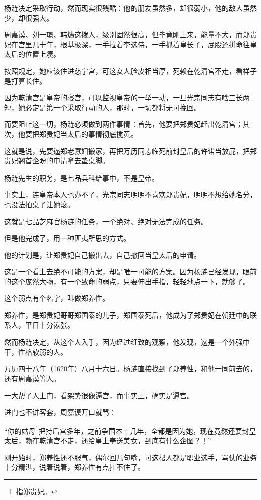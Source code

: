 \begin{multicols}{\theparacolNo}
		杨涟决定采取行动，然而现实很残酷：他的朋友虽然多，却很弱小，他的敌人虽然少，却很强大。

		周嘉谟、刘一璟、韩爌这拨人，级别固然很高，但毕竟刚上来，能量不大，而郑贵妃在宫里几十年，根基极深，一手拉着李选侍，一手抓着皇长子，屁股还拼命往皇太后的位置上凑。

		按照规定，她应该住进慈宁宫，可这女人脸皮相当厚，死赖在乾清宫不走，看样子是打算长住。

		因为乾清宫是皇帝的寝宫，可以监视皇帝的一举一动，一旦光宗同志有啥三长两短，她必定是第一个采取行动的人，那时，一切都将无可挽回。

		而要阻止这一切，杨涟必须做到两件事情：首先，他要把郑贵妃赶出乾清宫；其次，他要把郑贵妃当太后的事情彻底搅黄。

		这就是说，先要逼郑老寡妇搬家，再把万历同志临死前封皇后的许诺当放屁，把郑贵妃翘首企盼的申请拿去垫桌脚。

		杨涟先生的职务，是七品兵科给事中，不是皇帝。

		事实上，连皇帝本人也办不了，光宗同志明明不喜欢郑贵妃，明明不想给她名分，也没法拍桌子让她滚。

		这就是七品芝麻官杨涟的任务，一个绝对、绝对无法完成的任务。

		但是他完成了，用一种匪夷所思的方式。

		他的计划是，让郑贵妃自己搬出去，自己撤回当皇太后的申请。

		这是一个看上去绝不可能的方案，却是唯一可能的方案。因为杨涟已经发现，眼前的这个庞然大物，有一个致命的弱点，只要伸出手指，轻轻地点一下，就够了。

		这个弱点有个名字，叫做郑养性。

		郑养性，是郑贵妃哥哥郑国泰的儿子，郑国泰死后，他成为了郑贵妃在朝廷中的联系人，平日十分嚣张。

		然而杨涟决定，从这个人入手，因为经过细致的观察，他发现，这是一个外强中干，性格软弱的人。

		万历四十八年（1620年）八月十六日。杨涟直接找到了郑养性，和他一同前去的，还有周嘉谟等人。

		一大帮子人上门，看架势很像逼宫，而事实上，确实是逼宫。

		进门也不讲客套，周嘉谟开口就骂：

		“你的姑母\footnote{指郑贵妃。}把持后宫多年，之前争国本十几年，全都是因为她，现在竟然还要封皇太后，赖在乾清宫不走，还给皇上奉送美女，到底有什么企图？！”

		刚开始时，郑养性还不服气，偶尔回几句嘴，可这帮人都是职业选手，骂仗的业务十分精湛，说着说着，郑养性有点扛不住了。


\end{multicols}
